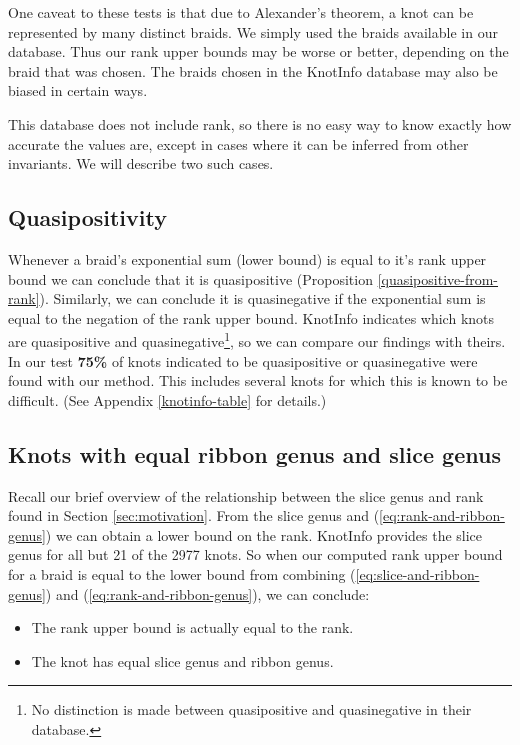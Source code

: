 \documentclass[12pt]{thesis}
\begin{document}
One caveat to these tests is that due
to Alexander's theorem, a knot can be represented by many distinct braids.
We simply used the braids available in our database.
Thus our rank upper bounds may be worse or better, depending on the braid that was chosen.
The braids chosen in the KnotInfo database may also be biased in certain ways.

This database does not include rank,
so there is no easy way to know exactly how accurate the values are,
except in cases where it can be inferred from other invariants.
We will describe two such cases.

\subsection{Quasipositivity}

Whenever a braid's exponential sum (lower bound) is equal to it's rank upper bound 
we can conclude that it is quasipositive (Proposition \ref{quasipositive-from-rank}).
Similarly, we can conclude it is quasinegative if the exponential sum is equal to the negation of the rank upper bound.
KnotInfo indicates which knots are quasipositive and quasinegative\footnote{No distinction is made between quasipositive and quasinegative in their database.}, so we can compare our findings with theirs.
In our test \textbf{75\%} of knots indicated to be quasipositive or quasinegative were found with our method.
This includes several knots for which this is known to be difficult.
(See Appendix \ref{knotinfo-table} for details.)

\subsection{Knots with equal ribbon genus and slice genus}

Recall our brief overview of the relationship between
the slice genus and rank found in Section \ref{sec:motivation}.
From the slice genus and (\ref{eq:rank-and-ribbon-genus})
we can obtain a lower bound on the rank.
KnotInfo provides the slice genus for all
but 21 of the 2977 knots.
So when our computed rank upper bound for a braid is equal to the lower bound
from combining (\ref{eq:slice-and-ribbon-genus}) and (\ref{eq:rank-and-ribbon-genus}), we can conclude:
\begin{itemize}
    \item The rank upper bound is actually equal to the rank.
    \item The knot has equal slice genus and ribbon genus.
\end{itemize}
\end{document}
